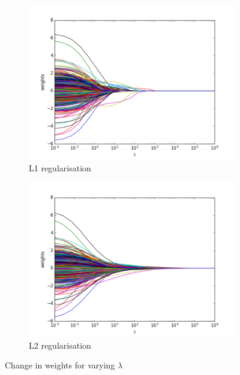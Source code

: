 \documentclass[paper=a4,fontsize=12pt]{article}
\begin{document}
\begin{figure}[H]
\centering
\begin{subfigure}{.5\textwidth}
  \centering
  \includegraphics[width=1\linewidth]{05_L1regularisation_hf_wm}
  \caption{L1 regularisation}
  \label{fig:sub1}
\end{subfigure}%
\begin{subfigure}{.5\textwidth}
  \centering
  \includegraphics[width=1\linewidth]{06_L2regularisation_hf_wm}
  \caption{L2 regularisation}
  \label{fig:sub2}
\end{subfigure}
\caption{Change in weights for varying $\lambda$}
\label{fig:test}
\end{figure}
\end{document}
